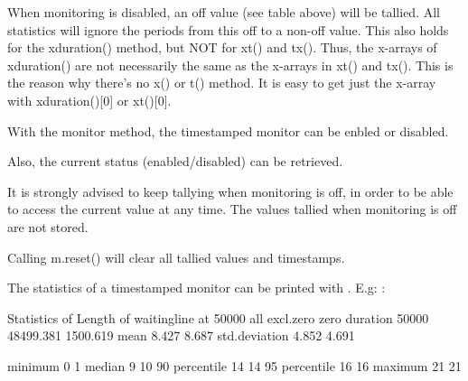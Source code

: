 \documentclass[letterpaper,10pt,english]{sphinxmanual}
\begin{document}
When monitoring is disabled, an off value (see table above) will be tallied. All statistics will ignore the periods from this
off to a non-off value. This also holds for the xduration() method, but NOT for xt() and tx(). Thus,
the x-arrays of xduration() are not necessarily the same as the x-arrays in xt() and tx(). This is
the reason why there’s no x() or t() method. 
It is easy to get just the x-array with xduration(){[}0{]} or xt(){[}0{]}.

With the monitor method, the timestamped monitor can be enbled or disabled.

Also, the current status (enabled/disabled) can be retrieved.

\begin{sphinxVerbatim}[commandchars=\\\{\}]
  
  
 
\end{sphinxVerbatim}

It is strongly advised to keep tallying when monitoring is off, in order to be able to access the current value at any time. The values tallied when monitoring is off
are not stored.

Calling m.reset() will clear all tallied values and timestamps.

The statistics of a timestamped monitor can be printed with .
E.g: :

\begin{sphinxVerbatim}[commandchars=\\\{\}]
Statistics of Length of waitingline at     50000
                        all    excl.zero         zero
\PYGZhy{}\PYGZhy{}\PYGZhy{}\PYGZhy{}\PYGZhy{}\PYGZhy{}\PYGZhy{}\PYGZhy{}\PYGZhy{}\PYGZhy{}\PYGZhy{}\PYGZhy{}\PYGZhy{}\PYGZhy{} \PYGZhy{}\PYGZhy{}\PYGZhy{}\PYGZhy{}\PYGZhy{}\PYGZhy{}\PYGZhy{}\PYGZhy{}\PYGZhy{}\PYGZhy{}\PYGZhy{}\PYGZhy{} \PYGZhy{}\PYGZhy{}\PYGZhy{}\PYGZhy{}\PYGZhy{}\PYGZhy{}\PYGZhy{}\PYGZhy{}\PYGZhy{}\PYGZhy{}\PYGZhy{}\PYGZhy{} \PYGZhy{}\PYGZhy{}\PYGZhy{}\PYGZhy{}\PYGZhy{}\PYGZhy{}\PYGZhy{}\PYGZhy{}\PYGZhy{}\PYGZhy{}\PYGZhy{}\PYGZhy{}
duration          50000        48499.381     1500.619
mean                  8.427        8.687
std.deviation         4.852        4.691

minimum               0            1
median                9           10
90\PYGZpc{} percentile       14           14
95\PYGZpc{} percentile       16           16
maximum              21           21
\end{sphinxVerbatim}
\end{document}

